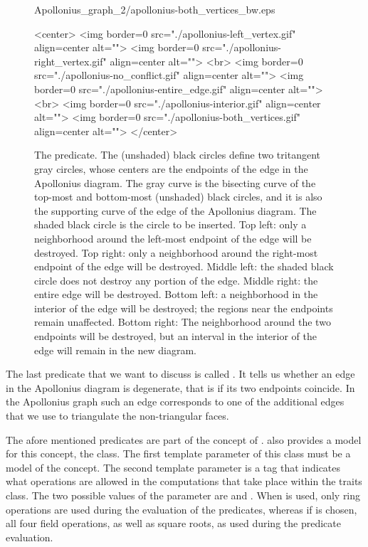 \begin{figure}[!t]
\begin{ccTexOnly}
\begin{center}
{Apollonius_graph_2/apollonius-both_vertices_bw.eps}\\
\end{center}
\end{ccTexOnly}
\caption{The  predicate. The
  (unshaded) black circles define two tritangent gray circles, whose
  centers are the endpoints of the edge in the Apollonius diagram.
  The gray curve is the bisecting curve of the top-most and
  bottom-most (unshaded) black circles, and it is also the supporting 
  curve of the edge of the Apollonius diagram. The shaded black circle
  is the circle to be inserted. Top left: only a neighborhood around
  the left-most endpoint of the edge will be destroyed. Top right:
  only a neighborhood around the right-most endpoint of the edge will
  be destroyed. Middle left: the shaded black circle does not destroy
  any portion of the edge. Middle right: the entire edge will be
  destroyed. Bottom left: a neighborhood in the interior of the edge
  will be destroyed; the regions near the endpoints remain
  unaffected. Bottom right: The neighborhood around the two endpoints
  will be destroyed, but an interval in the interior of the edge will
  remain in the new diagram.}\label{fig-ag2edgeconflict}
\begin{ccHtmlOnly}
<center>
<img border=0 src="./apollonius-left_vertex.gif" align=center alt="">
<img border=0 src="./apollonius-right_vertex.gif" align=center alt="">
<br>
<img border=0 src="./apollonius-no_conflict.gif" align=center alt="">
<img border=0 src="./apollonius-entire_edge.gif" align=center alt="">
<br>
<img border=0 src="./apollonius-interior.gif" align=center alt="">
<img border=0 src="./apollonius-both_vertices.gif" align=center alt="">
</center>
\end{ccHtmlOnly}
\end{figure}

The last predicate that we want to discuss is called
. It tells us whether an edge in the
Apollonius diagram is degenerate, that is if its two endpoints
coincide. In the Apollonius graph such an edge corresponds to one of
the additional edges that we use to triangulate the non-triangular
faces.

The afore mentioned predicates are part of the
 concept of \cgal. \cgal{} also provides
a model for this concept, the
 class. The first
template parameter of this class must be a model of the 
concept. The second template parameter is a tag that indicates what
operations are allowed in the computations that take place within the
traits class.
The two possible values of the  parameter are
 and . When
 is used, only ring operations are used during the
evaluation of the predicates, whereas if  is
chosen, all four field operations, as well as square roots, as used
during the predicate evaluation.

